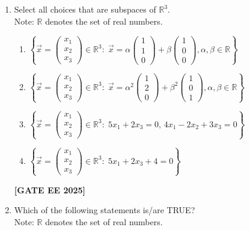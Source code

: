 \documentclass[journal]{IEEEtran}
\newcommand{\qfooter}{%
  \begin{flushright}\footnotesize\textbf{[GATE EE 2025]}\end{flushright}\vspace{1em}%
}
\begin{document}
\begin{enumerate}
\item Select all choices that are subspaces of $\mathbb{R}^3$.\\
Note: $\mathbb{R}$ denotes the set of real numbers.

\begin{enumerate}
\item $\left\{\vec{x} = \begin{pmatrix}x_1\\x_2\\x_3\end{pmatrix} \in \mathbb{R}^3:\;\vec{x} = \alpha \begin{pmatrix}1\\1\\0\end{pmatrix}+\beta\begin{pmatrix}1\\0\\0\end{pmatrix}, \alpha, \beta\in \mathbb{R}\right\}$
\item $\left\{\vec{x} = \begin{pmatrix}x_1\\x_2\\x_3\end{pmatrix} \in \mathbb{R}^3:\;\vec{x} = \alpha^2 \begin{pmatrix}1\\2\\0\end{pmatrix}+\beta^2\begin{pmatrix}1\\0\\1\end{pmatrix}, \alpha, \beta\in \mathbb{R}\right\}$
\item $\left\{\vec{x} = \begin{pmatrix}x_1\\x_2\\x_3\end{pmatrix} \in \mathbb{R}^3:\;5x_1 + 2x_3 = 0,\, 4x_1-2x_2+3x_3=0\right\}$
\item $\left\{\vec{x} = \begin{pmatrix}x_1\\x_2\\x_3\end{pmatrix} \in \mathbb{R}^3:\;5x_1 + 2x_3 + 4 = 0\right\}$
\end{enumerate}
\qfooter


\item Which of the following statements is/are TRUE?\\
Note: $\mathbb{R}$ denotes the set of real numbers.


\end{enumerate}
\end{document}

